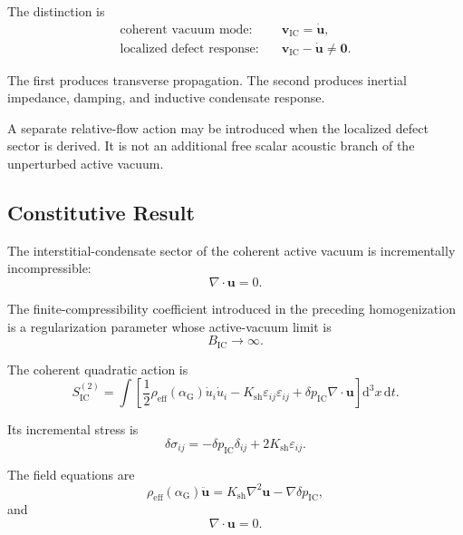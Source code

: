 The distinction is
\begin{equation}
    \boxed{
    \begin{aligned}
        \text{coherent vacuum mode:}&\quad \mathbf{v}_{\mathrm{IC}} = \dot{\mathbf{u}}, \\[3pt]
        \text{localized defect response:}&\quad \mathbf{v}_{\mathrm{IC}} - \dot{\mathbf{u}} \neq \mathbf{0}.
    \end{aligned}
    }
\end{equation}

The first produces transverse propagation. The second produces inertial impedance, damping, and inductive condensate response.

A separate relative-flow action may be introduced when the localized defect sector is derived. It is not an additional free scalar acoustic branch of the unperturbed active vacuum.

\subsection{Constitutive Result}

The interstitial-condensate sector of the coherent active vacuum is incrementally incompressible:
\begin{equation}
    \boxed{ \nabla\cdot\mathbf{u} = 0 }.
\end{equation}

The finite-compressibility coefficient introduced in the preceding homogenization is a regularization parameter whose active-vacuum limit is
\begin{equation}
    \boxed{ B_{\mathrm{IC}} \rightarrow \infty }.
\end{equation}

The coherent quadratic action is
\begin{equation}
    \boxed{ S_{\mathrm{IC}}^{(2)} = \int \left[ \frac{1}{2} \rho_{\mathrm{eff}} \left( \alpha_{\mathrm{G}} \right) \dot{u}_i\dot{u}_i - K_{\mathrm{sh}} \varepsilon_{ij}\varepsilon_{ij} + \delta p_{\mathrm{IC}} \nabla\cdot\mathbf{u} \right] \mathrm{d}^3x \, \mathrm{d}t }.
\end{equation}

Its incremental stress is
\begin{equation}
    \boxed{ \delta\sigma_{ij} = - \delta p_{\mathrm{IC}}\delta_{ij} + 2K_{\mathrm{sh}}\varepsilon_{ij} }.
\end{equation}

The field equations are
\begin{equation}
    \boxed{ \rho_{\mathrm{eff}} \left( \alpha_{\mathrm{G}} \right) \ddot{\mathbf{u}} = K_{\mathrm{sh}} \nabla^2\mathbf{u} - \nabla\delta p_{\mathrm{IC}} },
\end{equation}
and
\begin{equation}
    \boxed{ \nabla\cdot\mathbf{u} = 0 }.
\end{equation}

